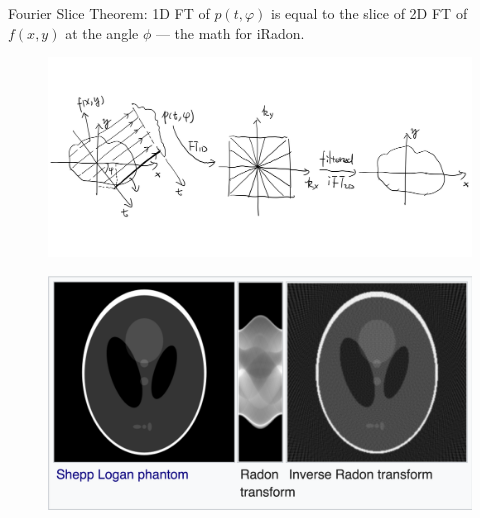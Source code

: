 \documentclass[slidestop,compress,12pt]{beamer}
\begin{document}
\begin{frame}
    Fourier Slice Theorem: 1D FT of $p(t,\varphi)$ is equal to the slice of 2D FT of $f(x,y)$ at the angle $\phi$ --- the math for iRadon.
    \vspace{-0.23cm}
    \begin{figure}
        \includegraphics[scale=0.15]{imgs/iradon.jpg}
    \end{figure}

\end{frame}

\begin{frame}
    \begin{figure}
        \includegraphics[scale=0.4]{imgs/eg3.png}
    \end{figure}
\end{frame}
\end{document}
